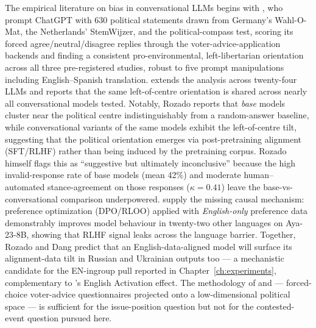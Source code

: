 The empirical literature on bias in conversational LLMs begins with
\citet{hartmann2023chatgpt}, who prompt ChatGPT with 630 political
statements drawn from Germany's Wahl-O-Mat, the Netherlands' StemWijzer,
and the political-compass test, scoring its forced
agree/neutral/disagree replies through the voter-advice-application
backends and finding a consistent pro-environmental, left-libertarian
orientation across all three pre-registered studies, robust to five
prompt manipulations including English--Spanish translation.
\citet{rozado2024} extends the analysis across twenty-four LLMs and
reports that the same left-of-centre orientation is shared across nearly
all conversational models tested. Notably, Rozado reports that
\emph{base} models cluster near the political centre indistinguishably
from a random-answer baseline, while conversational variants of the
same models exhibit the left-of-centre tilt, suggesting that the
political orientation emerges via post-pretraining alignment
(SFT/RLHF) rather than being induced by the pretraining corpus.
Rozado himself flags this as ``suggestive but ultimately inconclusive''
because the high invalid-response rate of base models (mean 42\%) and
moderate human--automated stance-agreement on those responses
($\kappa = 0.41$) leave the base-vs-conversational comparison
underpowered. \citet{dang2024rlhf}
supply the missing causal mechanism: preference optimization (DPO/RLOO)
applied with \emph{English-only} preference data demonstrably improves
model behaviour in twenty-two other languages on Aya-23-8B, showing
that RLHF signal leaks across the language barrier. Together, Rozado
and Dang predict that an English-data-aligned model will surface its
alignment-data tilt in Russian and Ukrainian outputs too --- a
mechanistic candidate for the EN-ingroup pull reported in
Chapter~\ref{ch:experiments}, complementary to \citet{zhao2025makieval}'s
English Activation effect. The methodology of \citet{hartmann2023chatgpt}
and \citet{rozado2024} --- forced-choice voter-advice questionnaires
projected onto a low-dimensional political space --- is sufficient for
the issue-position question but not for the contested-event question
pursued here.

